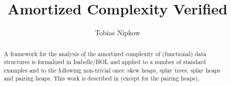 \documentclass[11pt,a4paper]{article}
\begin{document}
\title{Amortized Complexity Verified}
\author{Tobias Nipkow}
\maketitle

\begin{abstract}
  A framework for the analysis of the amortized complexity of (functional)
  data structures is formalized in Isabelle/HOL and applied to a number of
  standard examples and to the following non-trivial ones: skew heaps,
  splay trees, splay heaps and pairing heaps. This work is described
  in \cite{Nipkow-ITP15} (except for the pairing heaps).
\end{abstract}

\setcounter{tocdepth}{2}
\tableofcontents
\newpage





\end{document}
